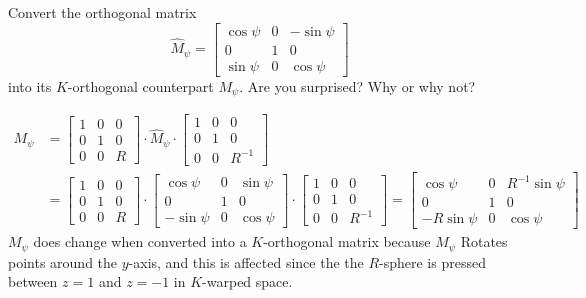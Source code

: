 \documentclass[newpage,hints,handout]{ximera}
\begin{document}
\begin{problem}
  Convert the orthogonal matrix
  \[
  \hat{M}_\psi=\begin{bmatrix}
  \cos\psi & 0 & -\sin\psi\\
  0 & 1 & 0\\
  \sin\psi & 0 & \cos\psi
  \end{bmatrix}
  \]
  into its $K$-orthogonal counterpart $M_\psi$. Are you surprised? Why or why not?
  
\begin{freeResponse}
\begin{align*}
M_\psi &= \begin{bmatrix}
1 & 0 & 0\\
0 & 1 & 0\\
0 & 0 & R%
\end{bmatrix} \cdot \hat{M}_\psi \cdot
\begin{bmatrix}
1 & 0 & 0\\
0 & 1 & 0\\
0 & 0 & R^{-1}%
\end{bmatrix} \\
&= \begin{bmatrix}
1 & 0 & 0\\
0 & 1 & 0\\
0 & 0 & R%
\end{bmatrix} \cdot 
\begin{bmatrix}
  \cos\psi & 0 & \sin\psi\\
  0 & 1 & 0\\
  -\sin\psi & 0 & \cos\psi
  \end{bmatrix} \cdot
\begin{bmatrix}
1 & 0 & 0\\
0 & 1 & 0\\
0 & 0 & R^{-1}%
\end{bmatrix}
=\begin{bmatrix}
  \cos\psi & 0 & R^{-1} \sin\psi\\
  0 & 1 & 0\\
  -R\sin\psi & 0 & \cos\psi
  \end{bmatrix} 
\end{align*} 
$M_\psi$ does change when converted into a $K$-orthogonal matrix because $M_\psi$ Rotates points around the $y$-axis, and this is affected since the  the $R$-sphere is pressed between $z=1$ and $z=-1$ in $K$-warped space. 
\end{freeResponse}

\end{problem}
\end{document}
